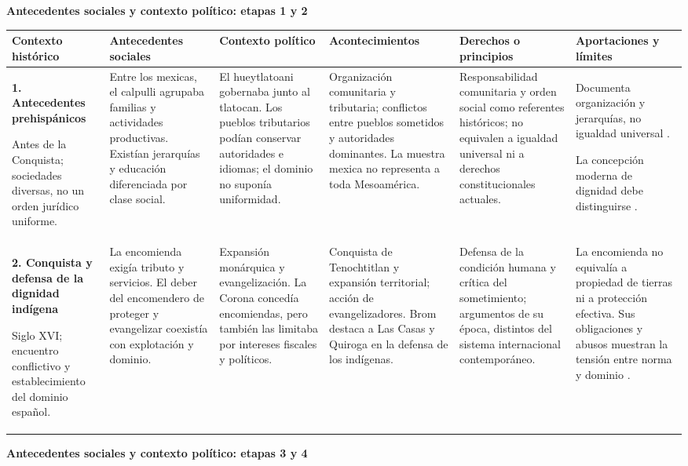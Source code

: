\documentclass[12pt,spanish,letterpaper,oneside]{article}
\newcommand{\encabezado}{\rowcolor{cabecera}\textbf{Contexto hist\'orico}&\textbf{Antecedentes sociales}&\textbf{Contexto pol\'itico}&\textbf{Acontecimientos}&\textbf{Derechos o principios}&\textbf{Aportaciones y l\'imites}\\\hline}
\begin{document}
\clearpage
\begin{landscape}
\pagestyle{empty}
\singlespacing
\setlength{\parindent}{0pt}
\setlength{\parskip}{0pt}
\setlength{\tabcolsep}{4pt}
\setlength{\extrarowheight}{0pt}
\renewcommand{\arraystretch}{1}
\fontsize{12}{14.5}\selectfont
\noindent\textbf{Antecedentes sociales y contexto pol\'itico: etapas 1 y 2}\par\medskip
\begin{tabularx}{\linewidth}{|Y|Y|Y|Y|Y|Y|}
\hline\encabezado
\textbf{1. Antecedentes prehisp\'anicos}\par Antes de la Conquista; sociedades diversas, no un orden jur\'idico uniforme.
& Entre los mexicas, el calpulli agrupaba familias y actividades productivas. Exist\'ian jerarqu\'ias y educaci\'on diferenciada por clase social.
& El hueytlatoani gobernaba junto al tlatocan. Los pueblos tributarios pod\'ian conservar autoridades e idiomas; el dominio no supon\'ia uniformidad.
& Organizaci\'on comunitaria y tributaria; conflictos entre pueblos sometidos y autoridades dominantes. La muestra mexica no representa a toda Mesoam\'erica.
& Responsabilidad comunitaria y orden social como referentes hist\'oricos; no equivalen a igualdad universal ni a derechos constitucionales actuales.
& Documenta organizaci\'on y jerarqu\'ias, no igualdad universal \citep[cap.~1]{brom2017}.\par La concepci\'on moderna de dignidad debe distinguirse \citep[p.~11]{alvarez2009}.\\\hline
\textbf{2. Conquista y defensa de la dignidad ind\'igena}\par Siglo XVI; encuentro conflictivo y establecimiento del dominio espa\~nol.
& La encomienda exig\'ia tributo y servicios. El deber del encomendero de proteger y evangelizar coexist\'ia con explotaci\'on y dominio.
& Expansi\'on mon\'arquica y evangelizaci\'on. La Corona conced\'ia encomiendas, pero tambi\'en las limitaba por intereses fiscales y pol\'iticos.
& Conquista de Tenochtitlan y expansi\'on territorial; acci\'on de evangelizadores. Brom destaca a Las Casas y Quiroga en la defensa de los ind\'igenas.
& Defensa de la condici\'on humana y cr\'itica del sometimiento; argumentos de su \'epoca, distintos del sistema internacional contempor\'aneo.
& La encomienda no equival\'ia a propiedad de tierras ni a protecci\'on efectiva. Sus obligaciones y abusos muestran la tensi\'on entre norma y dominio \citep[caps.~4--5]{brom2017}.\\\hline
\end{tabularx}
\clearpage
\noindent\textbf{Antecedentes sociales y contexto pol\'itico: etapas 3 y 4}\par\medskip

\end{landscape}
\end{document}
